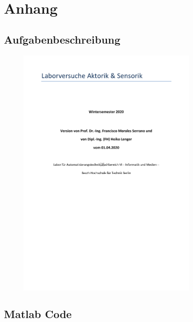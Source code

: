 \section{Anhang}

\subsection{Aufgabenbeschreibung}
\begin{figure}[H]
    \centering
    \includegraphics[page=7, width=0.8\textwidth]{../Aufgabenstellung.pdf}
    \label{fig:Aufgabenstellung Labor 3}
\end{figure}


\subsection{Matlab Code}




